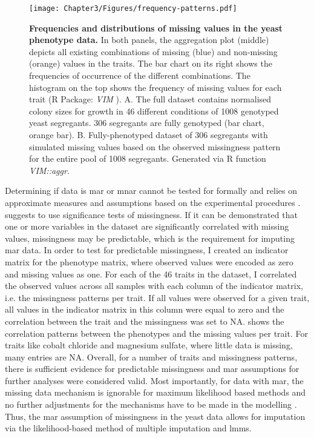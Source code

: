 \begin{figure}[p]
	\centering
	\texttt{[image: Chapter3/Figures/frequency-patterns.pdf]}
	\caption[\textbf{Frequencies and distributions of missing values in the yeast phenotype data.}]{\textbf{Frequencies and distributions of missing values in the yeast phenotype data. }In both panels, the aggregation plot (middle) depicts all existing combinations of missing (blue) and non-missing (orange) values in the traits. The bar chart on its right shows the frequencies of occurrence of the different combinations. The histogram on the top shows the frequency of missing values for each trait (R Package: \emph{VIM} \citep{Templ2012}). A. The full dataset contains normalised colony sizes for growth in \num{46} different conditions of \num{1008} genotyped yeast segregants. \num{306} segregants are fully genotyped (bar chart, orange bar). B. Fully-phenotyped dataset of \num{306} segregants with simulated missing values based on the observed missingness pattern for the entire pool of \num{1008} segregants.  Generated via R function \textit{VIM::aggr}.}
 	\label{fig:missingness}
\end{figure}

Determining if data is \gls{mar} or \gls{mnar} cannot be tested for formally and relies on approximate measures and assumptions based on the experimental procedures \citep{Schafer2002,Garson2015,Templ2012}. \citet{Garson2015} suggests to use significance tests of missingness. If it can be demonstrated that one or more variables in the dataset are significantly correlated with missing values, missingness may be predictable, which is the requirement for imputing \gls{mar} data. In order to test for predictable missingness, I created an indicator matrix for the phenotype matrix, where observed values were encoded as zero and missing values as one. For each of the \num{46} traits in the dataset, I correlated the observed values across all samples with each column of the indicator matrix, i.e. the missingness patterns per trait. If all values were observed for a given trait, all values in the indicator matrix in this column were equal to zero and the correlation between the trait and the missingness was set to NA.  shows the correlation patterns between the phenotypes and the missing values per trait. For traits like cobalt chloride and magnesium sulfate, where little data is missing, many entries are NA. Overall, for a number of traits and missingness patterns, there is sufficient evidence for predictable missingness and \gls{mar} assumptions for further analyses were considered valid. Most importantly, for data with \gls{mar}, the missing data mechanism is ignorable for maximum likelihood based methods and no further adjustments for the mechanisms have to be made in the modelling \citep{Rubin1976,Little1988}. Thus, the \gls{mar} assumption of missingness in the yeast data allows for imputation via the likelihood-based method of multiple imputation and \glspl{lmm}.


